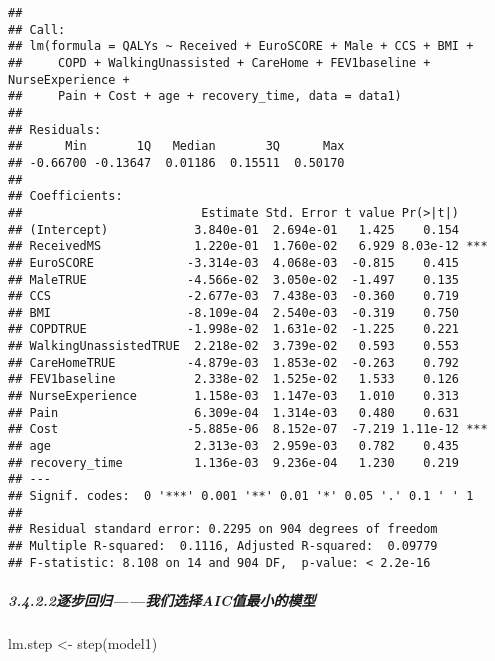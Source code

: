\documentclass[
]{article}
\newenvironment{Shaded}{\begin{snugshade}}{\end{snugshade}}
\newcommand{\FunctionTok}[1]{\textcolor[rgb]{0.00,0.00,0.00}{#1}}
\newcommand{\NormalTok}[1]{#1}
\newcommand{\OtherTok}[1]{\textcolor[rgb]{0.56,0.35,0.01}{#1}}
\begin{document}
\begin{verbatim}
## 
## Call:
## lm(formula = QALYs ~ Received + EuroSCORE + Male + CCS + BMI + 
##     COPD + WalkingUnassisted + CareHome + FEV1baseline + NurseExperience + 
##     Pain + Cost + age + recovery_time, data = data1)
## 
## Residuals:
##      Min       1Q   Median       3Q      Max 
## -0.66700 -0.13647  0.01186  0.15511  0.50170 
## 
## Coefficients:
##                         Estimate Std. Error t value Pr(>|t|)    
## (Intercept)            3.840e-01  2.694e-01   1.425    0.154    
## ReceivedMS             1.220e-01  1.760e-02   6.929 8.03e-12 ***
## EuroSCORE             -3.314e-03  4.068e-03  -0.815    0.415    
## MaleTRUE              -4.566e-02  3.050e-02  -1.497    0.135    
## CCS                   -2.677e-03  7.438e-03  -0.360    0.719    
## BMI                   -8.109e-04  2.540e-03  -0.319    0.750    
## COPDTRUE              -1.998e-02  1.631e-02  -1.225    0.221    
## WalkingUnassistedTRUE  2.218e-02  3.739e-02   0.593    0.553    
## CareHomeTRUE          -4.879e-03  1.853e-02  -0.263    0.792    
## FEV1baseline           2.338e-02  1.525e-02   1.533    0.126    
## NurseExperience        1.158e-03  1.147e-03   1.010    0.313    
## Pain                   6.309e-04  1.314e-03   0.480    0.631    
## Cost                  -5.885e-06  8.152e-07  -7.219 1.11e-12 ***
## age                    2.313e-03  2.959e-03   0.782    0.435    
## recovery_time          1.136e-03  9.236e-04   1.230    0.219    
## ---
## Signif. codes:  0 '***' 0.001 '**' 0.01 '*' 0.05 '.' 0.1 ' ' 1
## 
## Residual standard error: 0.2295 on 904 degrees of freedom
## Multiple R-squared:  0.1116, Adjusted R-squared:  0.09779 
## F-statistic: 8.108 on 14 and 904 DF,  p-value: < 2.2e-16
\end{verbatim}

\hypertarget{ux9010ux6b65ux56deux5f52ux6211ux4eecux9009ux62e9aicux503cux6700ux5c0fux7684ux6a21ux578b}{%
\subparagraph{3.4.2.2逐步回归------我们选择AIC值最小的模型}\label{ux9010ux6b65ux56deux5f52ux6211ux4eecux9009ux62e9aicux503cux6700ux5c0fux7684ux6a21ux578b}}

\begin{Shaded}
\begin{Highlighting}[]
\NormalTok{lm.step }\OtherTok{\textless{}{-}} \FunctionTok{step}\NormalTok{(model1)}
\end{Highlighting}
\end{Shaded}
\end{document}
